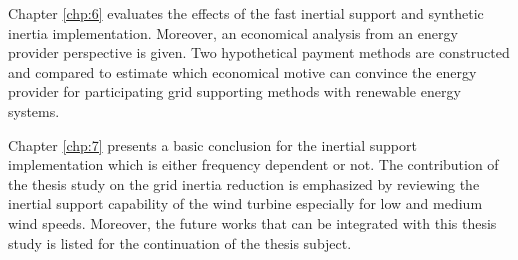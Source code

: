 Chapter \ref{chp:6} evaluates the effects of the fast inertial support and synthetic inertia implementation. Moreover, an economical analysis from an energy provider perspective is given. Two hypothetical payment methods are constructed and compared to estimate which economical motive can convince the energy provider for participating grid supporting methods with renewable energy systems. \par
Chapter \ref{chp:7} presents a basic conclusion for the inertial support implementation which is either frequency dependent or not. The contribution of the thesis study on the grid inertia reduction is emphasized by reviewing the inertial support capability of the wind turbine especially for low and medium wind speeds. Moreover, the future works that can be integrated with this thesis study is listed for the continuation of the thesis subject.